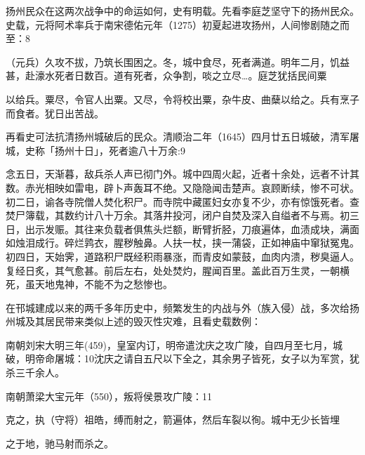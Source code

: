 扬州民众在这两次战争中的命运如何，史有明载。先看李庭芝坚守下的扬州民众。史载，元将阿术率兵于南宋德佑元年（1275）初夏起进攻扬州，人间惨剧随之而至：8

\begin{BookQuote}
（元兵）久攻不拔，乃筑长围困之。冬，城中食尽，死者满道。明年二月，饥益甚，赴濠水死者日数百。道有死者，众争割，啖之立尽…。庭芝犹括民间粟
\end{BookQuote}

\vfill
\begin{BookNotes}
\end{BookNotes}

以给兵。粟尽，令官人出粟。又尽，令将校出粟，杂牛皮、曲蘖以给之。兵有烹子而食者。犹日出苦战。

再看史可法抗清扬州城破后的民众。清顺治二年（1645）四月廿五日城破，清军屠城，史称「扬州十日」，死者逾八十万余:9

念五日，天渐暮，敌兵杀人声已彻门外。城中四周火起，近者十余处，远者不计其数。赤光相映如雷电，辟卜声轰耳不绝。又隐隐闻击楚声。哀顾断续，惨不可状。初二日，谕各寺院僧人焚化积尸。而寺院中藏匿妇女亦复不少，亦有惊饿死者。查焚尸簿载，其数约计八十万余。其落井投河，闭户自焚及深入自缢者不与焉。初三日，出示发赈。其往来负载者俱焦头烂额，断臂折胫，刀痕遍体，血渍成块，满面如烛泪成行。碎烂鹑衣，腥秽触鼻。人扶一杖，挟一蒲袋，正如神庙中窜狱冤鬼。初四日，天始霁，道路积尸既经积雨暴涨，而青皮如蒙鼓，血肉内溃，秽臭逼人。复经日炙，其气愈甚。前后左右，处处焚灼，腥闻百里。盖此百万生灵，一朝横死，虽天地鬼神，不能不为之愁惨也。

在邗城建成以来的两千多年历史中，频繁发生的内战与外（族入侵）战，多次给扬州城及其居民带来类似上述的毁灭性灾难，且看史载数例：

南朝刘宋大明三年(459)，皇室内订，明帝遣沈庆之攻广陵，自四月至七月，城破，明帝命屠城：10沈庆之请自五尺以下全之，其余男子皆死，女子以为军赏，犹杀三千余人。

南朝萧梁大宝元年（550），叛将侯景攻广陵：11

克之，执（守将）祖皓，缚而射之，箭遍体，然后车裂以徇。城中无少长皆埋

\vfill
\begin{BookNotes}
\end{BookNotes}

之于地，驰马射而杀之。


